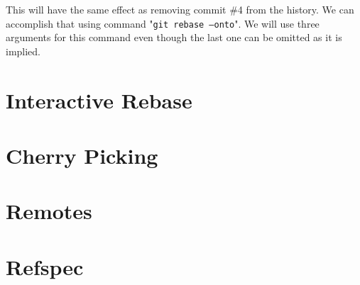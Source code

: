 \documentclass{article}
\theoremstyle{definition}
\begin{document}
        \noindent This will have the same effect as removing commit \#4 from the history. We can accomplish that using
        command "\texttt{git rebase --onto}". We will use three arguments for this command even though the last one
        can be omitted as it is implied.
        
		\section{Interactive Rebase}
        \section{Cherry Picking}
        \section{Remotes}
        \section{Refspec}
\end{document}
